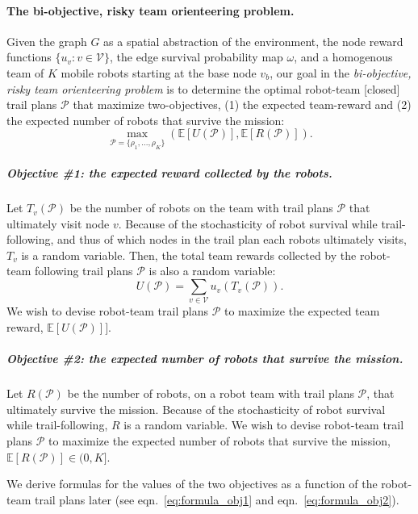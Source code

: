 \documentclass[11pt, oneside]{article}
\begin{document}
\paragraph{The bi-objective, risky team orienteering problem.}
Given the graph $G$ as a spatial abstraction of the environment, the node reward functions $\{u_v : v \in\mathcal{V}\}$, the edge survival probability map $\omega$, and a homogenous team of $K$ mobile robots starting at the base node $v_b$, our goal in the \emph{bi-objective, risky team orienteering problem} is to determine the optimal robot-team [closed] trail plans $\mathcal{P}$ that maximize two-objectives, (1) the expected team-reward and (2) the expected number of robots that survive the mission:
\begin{equation}
\max_{\mathcal{P}=\{\rho_1, ..., \rho_K\}} \left( \mathbb{E}[U(\mathcal{P})], \mathbb{E}[R(\mathcal{P})] \right).
\label{eq:the_two_objs}
\end{equation}

\vspace{-\baselineskip}
\subparagraph{Objective \#1: the expected reward collected by the robots.}
Let $T_v(\mathcal{P}) $ be the number of robots on the team with trail plans $\mathcal{P}$ that ultimately visit node $v$.
Because of the stochasticity of robot survival while trail-following, and thus of which nodes in the trail plan each robots ultimately visits, $T_v$ is a random variable.
Then, the total team rewards collected by the robot-team following trail plans $\mathcal{P}$ is also a random variable:
\begin{equation}
U(\mathcal{P}) = \sum_{v\in\mathcal{V}} u_v\left ( T_v(\mathcal{P}) \right).
\end{equation}
We wish to devise robot-team trail plans $\mathcal{P}$ to maximize the expected team reward, $\mathbb{E}[U(\mathcal{P})]]$.

\vspace{-\baselineskip}
\subparagraph{Objective \#2: the expected number of robots that survive the mission.}
Let $R(\mathcal{P})$ be the number of robots, on a robot team with trail plans $\mathcal{P}$, that ultimately survive the mission. Because of the stochasticity of robot survival while trail-following, $R$ is a random variable. We wish to devise robot-team trail plans $\mathcal{P}$ to maximize the expected number of robots that survive the mission, $\mathbb{E}[R(\mathcal{P})] \in (0, K]$.

We derive formulas for the values of the two objectives as a function of the robot-team trail plans later (see eqn.~\ref{eq:formula_obj1} and eqn.~\ref{eq:formula_obj2}). 
\end{document}
